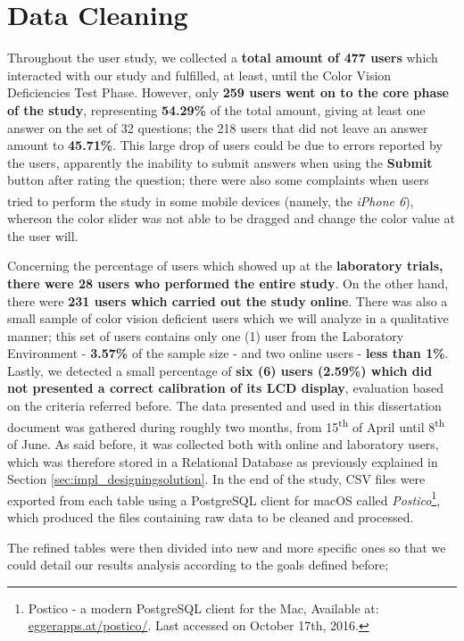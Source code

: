\section{Data Cleaning}
\label{sec:results_datacleaning}
%
Throughout the user study, we collected a \textbf{total amount of 477 users} which interacted with our study and fulfilled,
at least, until the Color Vision Deficiencies Test Phase. However, only \textbf{259 users went on to the core phase of the study},
representing \textbf{54.29\%} of the total amount, giving at least one answer on the set of 32 questions; the 218 users that did not leave an answer
amount to \textbf{45.71\%}. This large drop of users could be due to errors
reported by the users, apparently the inability to submit answers when using the \textbf{Submit} button after rating the question; there were also some complaints
when users tried to perform the study in some mobile devices (namely, the \emph{iPhone\textsuperscript{\textregistered} 6}), whereon the color slider was
not able to be dragged and change the color value at the user will. \par
%
Concerning the percentage of users which showed up at the \textbf{laboratory trials, there were 28 users who performed the entire study}.
On the other hand, there were \textbf{231 users which carried out the study online}. There was also a small sample of color vision
deficient users which we will analyze in a qualitative manner; this set of users contains only one (1) user from the Laboratory Environment - \textbf{3.57\%} of
the sample size - and two online users - \textbf{less than 1\%}. Lastly, we detected a small percentage of \textbf{six (6) users (2.59\%) which did not
presented a correct calibration of its LCD display}, evaluation based on the criteria referred before.
%
The data presented and used in this dissertation document was gathered during roughly two months, from 15\textsuperscript{th} of April until 8\textsuperscript{th}
of June. As said before, it was collected both with online and laboratory users, which was therefore stored in a Relational Database as previously explained in Section
\ref{sec:impl_designingsolution}. In the end of the study, \gls{CSV} files were exported from each table using a PostgreSQL client for macOS called
\emph{Postico}\footnote{Postico - a modern PostgreSQL client for the Mac, Available at: \url{eggerapps.at/postico/}. Last accessed on
October 17th, 2016.}, which produced the files containing raw data to be cleaned and processed. \par
%
The refined tables were then divided into new and more specific ones so that we could detail our results analysis according to the goals defined before;
